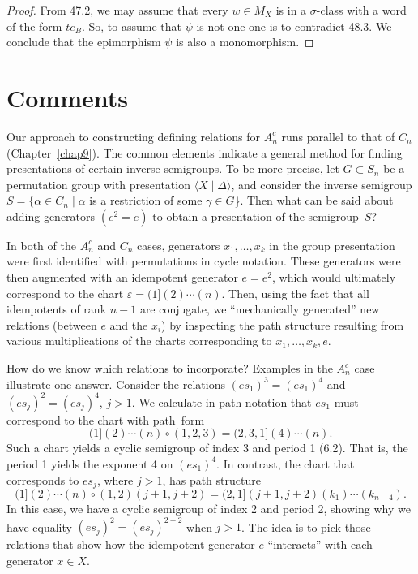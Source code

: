 \documentclass{surv-l}
\numberwithin{equation}{section}
\numberwithin{table}{section}
\numberwithin{figure}{section}
\theoremstyle{plain}
\theoremstyle{definition}
\begin{document}
\begin{proof} From 47.2, we may assume that every $w\in M_{X}$ is in a
$\sigma$-class with a word of the form $te_{B}$. So, to assume
that $\psi$ is not one-one is to contradict 48.3. We conclude
that the epimorphism $\psi$ is also a monomorphism.
\end{proof}

\section{Comments}\label{sec10.49}

Our approach to constructing defining relations for $A_{n}^{c}$
runs parallel to that of $C_{n}$ (Chapter~\ref{chap9}). The common
elements indicate a general method for finding presentations of
certain inverse semigroups. To be more precise, let $G\subset
S_{n}$ be a permutation group with presentation $\langle X \mid
\Delta\rangle$, and consider the inverse semigroup
$S=\{\alpha\in C_{n}\mid \alpha$ is a restriction of some
$\gamma\in G$\}. Then what can be said about adding generators
$(e^{2}=e)$ to obtain a presentation of the semigroup~$S$?

In both of the $A_{n}^{c}$ and $C_{n}$ cases, generators
$x_{1},\ldots, x_{k}$ in the group presentation were first
identified with permutations in cycle notation. These generators
were then augmented with an idempotent generator $e=e^{2}$, which
would ultimately correspond to the chart $\varepsilon
=(1](2)\cdots(n)$. Then, using the fact that all idempotents of
rank $n-1$ are conjugate, we ``mechanically generated'' new
relations (between $e$ and the $x_{i}$) by inspecting the path
structure resulting from various multiplications of the charts
corresponding to $x_{1},\ldots, x_{k}, e$.

How do we know which relations to incorporate? Examples in the
$A_{n}^{c}$ case illustrate one answer. Consider the relations
$(es_{1})^{3}=(es_{1})^{4}$ and $(es_{j})^{2}= (es_{j})^{4}$, $j>1$.
We calculate in path notation that $es_{1}$ must correspond to the
chart with path~form
\[
(1](2)\cdots (n)\circ(1,2,3)=(2,3,1](4)\cdots(n).
\]
Such a chart yields a cyclic semigroup of index 3 and period 1
(6.2). That is, the period 1 yields the exponent 4 on
$(es_{1})^{4}$. In contrast, the chart that corresponds to
$es_{j}$, where $j>1$, has path structure
\[
(1] (2)\cdots (n) \circ (1,2)(j+1, j+2)=(2,1](j+1,
j+2)(k_{1})\cdots(k_{n-4}).
\]
In this case, we have a cyclic semigroup of index 2 and period 2,
showing why we have equality $(es_{j})^{2}=(es_{j})^{2+2}$ when
$j>1$. The idea is to pick those relations that show how the
idempotent generator $e$ ``interacts'' with each generator $x\in X$.
\end{document}
